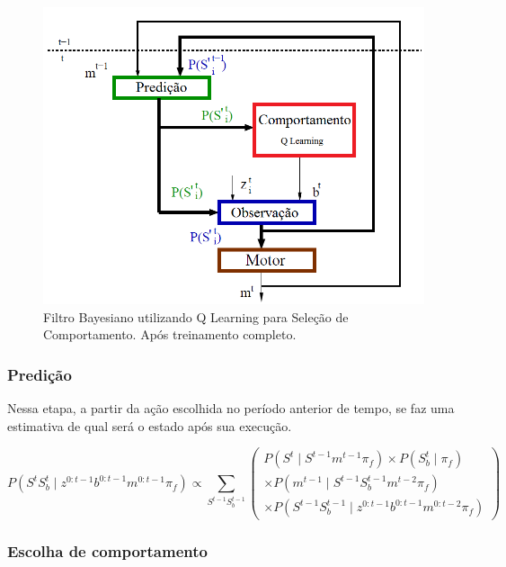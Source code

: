 \begin{figure}[h!]
    \centering
    \includegraphics[width=120mm]{images/modelo_bayesiano_final-tiago}
    \caption{\label{img:ModeloFinalPosTreinamento}Filtro Bayesiano utilizando Q Learning para Seleção de Comportamento. Após treinamento completo.}
\end{figure}

\subsubsection{Predição} \label{subsubsection:ModeloFinalPredicao}

Nessa etapa, a partir da ação escolhida no período anterior de tempo, se faz uma estimativa de qual será o estado após sua execução.

\begin{equation}
    P \left( S^t S_b^t \mid z^{0: t-1} b^{0: t-1} m^{0: t-1} \pi_f \right) \propto \sum\limits_{S^{t-1} S_b^{t-1}}
        \left(
            \begin{array}{l}
                P \left( S^t \mid S^{t-1} m^{t-1} \pi_f \right) \times P \left( S_b^t \mid \pi_f \right) \\
                \times P \left( m^{t-1} \mid S^{t-1} S_b^{t-1} m^{t-2} \pi_f \right)\\
                \times P \left( S^{t-1} S_b^{t-1} \mid z^{0: t-1} b^{0: t-1} m^{0: t-2} \pi_f \right)
            \end{array}
        \right)
\end{equation}


\subsubsection{Escolha de comportamento}


